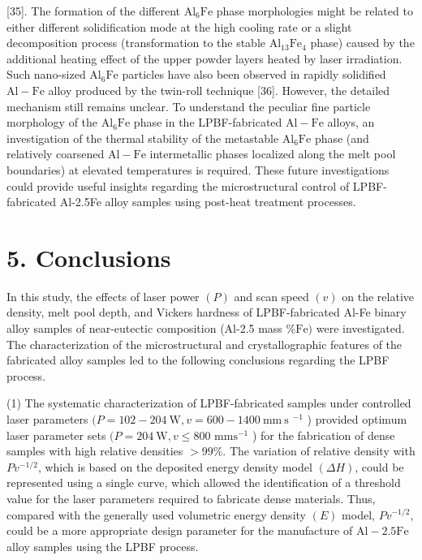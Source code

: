 \documentclass[10pt]{article}
\begin{document}
[35]. The formation of the different $\mathrm{Al}_{6} \mathrm{Fe}$ phase morphologies might be related to either different solidification mode at the high cooling rate or a slight decomposition process (transformation to the stable $\mathrm{Al}_{13} \mathrm{Fe}_{4}$ phase) caused by the additional heating effect of the upper powder layers heated by laser irradiation. Such nano-sized $\mathrm{Al}_{6} \mathrm{Fe}$ particles have also been observed in rapidly solidified $\mathrm{Al}-\mathrm{Fe}$ alloy produced by the twin-roll technique [36]. However, the detailed mechanism still remains unclear. To understand the peculiar fine particle morphology of the $\mathrm{Al}_{6} \mathrm{Fe}$ phase in the LPBF-fabricated $\mathrm{Al}-\mathrm{Fe}$ alloys, an investigation of the thermal stability of the metastable $\mathrm{Al}_{6} \mathrm{Fe}$ phase (and relatively coarsened $\mathrm{Al}-\mathrm{Fe}$ intermetallic phases localized along the melt pool boundaries) at elevated temperatures is required. These future investigations could provide useful insights regarding the microstructural control of LPBF-fabricated Al-2.5Fe alloy samples using post-heat treatment processes.

\section*{5. Conclusions}
In this study, the effects of laser power $(P)$ and scan speed $(v)$ on the relative density, melt pool depth, and Vickers hardness of LPBF-fabricated Al-Fe binary alloy samples of near-eutectic composition (Al-2.5 mass $\% \mathrm{Fe})$ were investigated. The characterization of the microstructural and crystallographic features of the fabricated alloy samples led to the following conclusions regarding the LPBF process.

(1) The systematic characterization of LPBF-fabricated samples under controlled laser parameters $(P=102-204 \mathrm{~W}, v=600-1400 \mathrm{~mm} \mathrm{~s}$ ${ }^{-1}$ ) provided optimum laser parameter sets $(P=204 \mathrm{~W}, v \leq 800$ $\mathrm{mm} \mathrm{s}{ }^{-1}$ ) for the fabrication of dense samples with high relative densities $>99 \%$. The variation of relative density with $P v^{-1 / 2}$, which is based on the deposited energy density model $(\Delta H)$, could be represented using a single curve, which allowed the identification of a threshold value for the laser parameters required to fabricate dense materials. Thus, compared with the generally used volumetric energy density $(E)$ model, $P v^{-1 / 2}$, could be a more appropriate design parameter for the manufacture of $\mathrm{Al}-2.5 \mathrm{Fe}$ alloy samples using the LPBF process.
\end{document}
